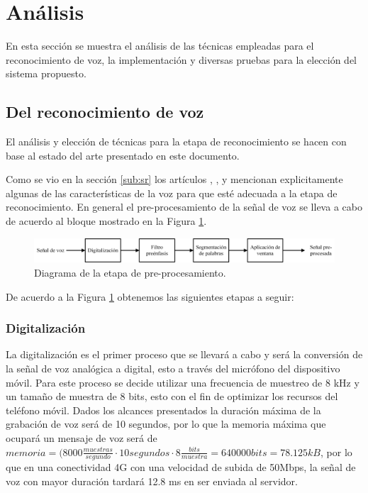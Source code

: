 
\section{Análisis}

En esta sección se muestra el análisis de las técnicas empleadas para el reconocimiento de voz, la implementación y diversas pruebas para la elección del sistema propuesto.

\subsection{Del reconocimiento de voz}

	El análisis y elección de técnicas para la etapa de reconocimiento se hacen con base al estado del arte presentado en este documento.
	
	Como se vio en la sección \ref{sub:sr} los artículos \cite{A30}, \cite{A31}, \cite{A6} y \cite{A7} mencionan explicitamente algunas de las características de la voz para que esté adecuada a la etapa de reconocimiento. En general el pre-procesamiento de la señal de voz se lleva a cabo de acuerdo al bloque mostrado en la Figura \ref{fig:ana:prepro}.
	
		\begin{figure}[H]
			\centering
			\includegraphics[width=1\linewidth]{figures/analisispreproce}
			\caption{Diagrama de la etapa de pre-procesamiento.}
			\label{fig:ana:prepro}
		\end{figure}
		
	De acuerdo a la Figura \ref{fig:ana:prepro} obtenemos las siguientes etapas a seguir:
	
	\subsubsection*{Digitalización}
	
	La digitalización es el primer proceso que se llevará a cabo y será la conversión de la señal de voz analógica a digital, esto a través del micrófono del dispositivo móvil. Para este proceso se decide utilizar una frecuencia de muestreo de 8 kHz y un tamaño de muestra de 8 bits, esto con el fin de optimizar los recursos del teléfono móvil. Dados los alcances presentados la duración máxima de la grabación de voz será de 10 segundos, por lo que la memoria máxima que ocupará un mensaje de voz será de $memoria=(8000\frac{muestras}{segundo}\cdot 10 segundos\cdot 8\frac{bits}{muestra}=640000 bits = 78.125 kB$, por lo que en una conectividad 4G con una velocidad de subida de 50Mbps, la señal de voz con mayor duración tardará 12.8 ms en ser enviada al servidor.
	
